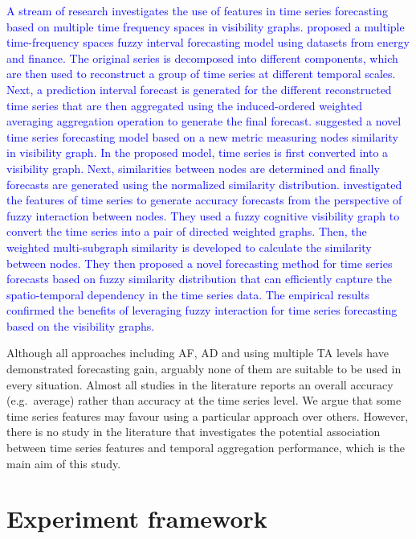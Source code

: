 \documentclass[preprint, 3p,
authoryear]{elsarticle} %
\begin{document}
\textcolor{blue}{A stream of research investigates the use of features in time series forecasting based on multiple time frequency spaces in visibility graphs.}
\citet{liu2020fuzzy}
\textcolor{blue}{proposed a multiple time-frequency spaces fuzzy interval forecasting model using datasets from energy and finance. The original series is decomposed into different components, which are then used to reconstruct a group of time series at different temporal scales. Next, a prediction interval forecast is generated for the different reconstructed time series that are then aggregated using the induced-ordered weighted averaging aggregation operation to generate the final forecast.}
\citet{hu2022efficient}
\textcolor{blue}{suggested a novel time series forecasting model based on a new metric measuring nodes similarity in visibility graph. In the proposed model, time series is first converted into a visibility graph. Next, similarities between nodes are determined and finally forecasts are generated using the normalized similarity distribution.}
\citet{hu2022time}
\textcolor{blue}{investigated the features of time series to generate accuracy forecasts from the perspective of fuzzy interaction between nodes. They used a fuzzy cognitive visibility graph to convert the time series into a pair of directed weighted graphs. Then, the weighted multi-subgraph similarity is developed to calculate the similarity between nodes. They then proposed a novel forecasting method for time series forecasts based on fuzzy similarity distribution that can efficiently capture the spatio-temporal dependency in the time series data. The empirical results confirmed the benefits of leveraging fuzzy interaction for time series forecasting based on the visibility graphs.}

Although all approaches including AF, AD and using multiple TA levels
have demonstrated forecasting gain, arguably none of them are suitable
to be used in every situation. Almost all studies in the literature
reports an overall accuracy (e.g.~average) rather than accuracy at the
time series level. We argue that some time series features may favour
using a particular approach over others. However, there is no study in
the literature that investigates the potential association between time
series features and temporal aggregation performance, which is the main
aim of this study.

\hypertarget{framework}{%
\section{Experiment framework}\label{framework}}
\end{document}
